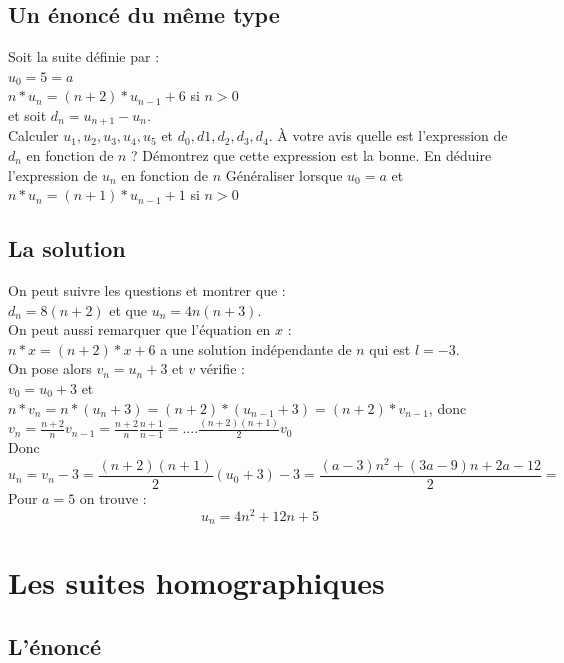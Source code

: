 \documentclass[a4paper,11pt]{book}
\begin{document}
\subsection{Un \'enonc\'e du m\^eme type}
Soit la suite d\'efinie par :\\
$u_0=5=a$\\
$n*u_{n}=(n+2)*u_{n-1}+6$ si $n>0$\\
et soit $d_n=u_{n+1}-u_n$.\\
Calculer $u_1,u_2,u_3,u_4,u_5$ et $d_0,d1,d_2,d_3,d_4$.
\`A votre avis quelle est l'expression de $d_n$ en fonction de $n$ ?
D\'emontrez que cette expression est la bonne.
En d\'eduire l'expression de $u_n$ en fonction de $n$
G\'en\'eraliser lorsque $u_0=a$ et $n*u_{n}=(n+1)*u_{n-1}+1$ si $n>0$\\
\subsection{La solution}
On peut suivre les questions et montrer que :\\
$d_n=8(n+2)$ et que $u_n=4n(n+3)$.\\
On peut aussi remarquer que l'\'equation en $x$ :\\
$n*x=(n+2)*x+6$ a une solution ind\'ependante de $n$ qui est $l=-3$.\\
On pose alors $v_n=u_n+3$ et $v$ v\'erifie :\\
$v_0=u_0+3$ et $n*v_n=n*(u_n+3)=(n+2)*(u_{n-1}+3)=(n+2)*v_{n-1}$, donc \\
$v_n=\frac{n+2}{n}v_{n-1}=\frac{n+2}{n}\frac{n+1}{n-1}=....\frac{(n+2)(n+1)}{2}v_0$\\
Donc
$$u_n=v_n-3=\frac{(n+2)(n+1)}{2}(u_0+3)-3=\frac{(a-3)n^2+(3a-9)n+2a-12}{2}=$$
Pour $a=5$ on trouve :
$$u_n=4n^2+12n+5$$
\section{Les suites homographiques}
\subsection{L'\'enonc\'e}
\end{document}
